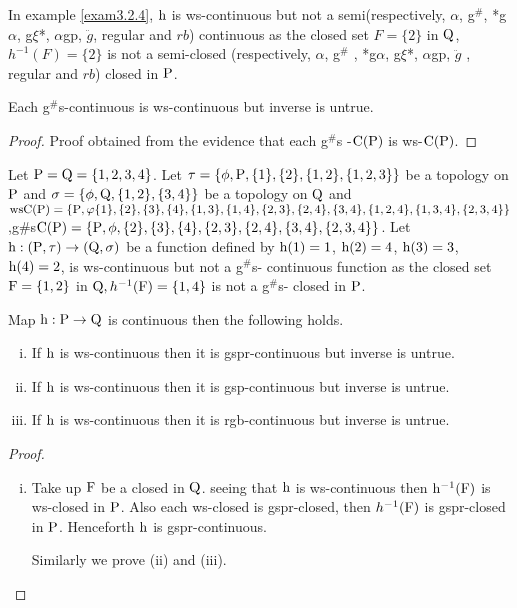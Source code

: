 \begin{exm}\label{exam3.2.6}
In example \ref{exam3.2.4}, $\mathrm{h}$ is ws-continuous but not a semi(respectively, $\alpha$, g$^{\#}$, *g$\alpha$, g$\xi$*, $\alpha$gp, $\ddot{g}$, regular and $rb$) continuous as the closed set $F=\{2\}$ in $\mathrm{Q}$, $h^{-1}(F)=\{ 2\}$ is not a semi-closed (respectively, $\alpha$, g$^{\#}$ , *g$\alpha$, g$\xi$*, $\alpha$gp, $\ddot{g}$ , regular and $rb$) closed in $\mathrm{P}$.
\end{exm}

\begin{thm}\label{thm3.2.7}
Each g$^{\#}$s-continuous is ws-continuous but inverse is untrue.
\end{thm}

\begin{proof}
Proof obtained from the evidence that each g$^{\#}$s -$\mathrm{C}(\mathrm{P})$ is ws-$\mathrm{C}(\mathrm{P})$.
\end{proof}

\begin{exm}\label{exam3.2.8}
Let $\mathrm{P}=\mathrm{Q}= \{1, 2, 3, 4\}$. Let $\tau = \{\phi, \mathrm{P}, \{1\}, \{2\}, \{1, 2\},\{1,2,3\}\}$ be a topology on $\mathrm{P}$ and $\sigma =\{\phi, \mathrm{Q}, \{1,2\},\{3,4\}\}$ be a topology on $\mathrm{Q}$ and $\mathrm{ws}\mathrm{C}(\mathrm{P})=\{\mathrm{P}, \varphi\{1\},\{2\},\{3\},\{4\},\{1,3\},\{1,4\},\{2,3\},\{2,4\},\{3,4\},\{1,2,4\},\{1,3,4\},\{2,3,4\}\}$,\break g\#s$\mathrm{C}(\mathrm{P})=\{\mathrm{P},\phi,\{2\}, \{3\},\{4\},\{2,3\},\{2,4\},\{3,4\},\{2,3,4\}\}$. Let $\mathrm{h}: (\mathrm{P}, \tau  )\to (\mathrm{Q}, \sigma)$ be a function defined by $\mathrm{h}(1)= 1$, $\mathrm{h}(2)=4$, $\mathrm{h}(3)=3$, $\mathrm{h}(4)=2$, is ws-continuous but not a g$^{\#}$s- continuous function as the closed set $\mathrm{F}=\{1,2\}$ in $\mathrm{Q}, h^{-1} (\mathrm{F})=\{1,4\}$ is not a g$^{\#}$s- closed in $\mathrm{P}$.
\end{exm}

\begin{thm}\label{thm3.2.9}
Map $\mathrm{h}: \mathrm{P}\to \mathrm{Q}$ is continuous then the following holds.
\begin{enumerate}[(i)]
\item If $\mathrm{h}$ is ws-continuous then it is gspr-continuous but inverse is untrue.
\item If $\mathrm{h}$ is ws-continuous then it is gsp-continuous but inverse is untrue.
\item If $\mathrm{h}$ is ws-continuous then it is rgb-continuous but inverse is untrue.
\end{enumerate}
\end{thm}

\begin{proof}
\begin{enumerate}[(i)]
\item Take up $\mathrm{F}$ be a closed in $\mathrm{Q}$. seeing that $\mathrm{h}$ is ws-continuous then $\mathrm{h}^{-1} (\mathrm{F})$ is ws-closed in $\mathrm{P}$. Also each ws-closed is gspr-closed, then $h^{-1}(\mathrm{F})$ is gspr-closed in $\mathrm{P}$. Henceforth $\mathrm{h}$ is gspr-continuous.

Similarly we prove (ii) and (iii).
\end{enumerate}
\end{proof}

